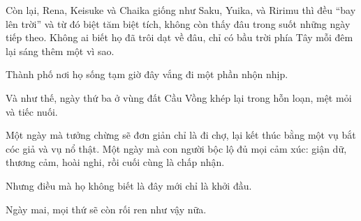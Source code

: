 \documentclass[../main.tex]{subfiles}
\begin{document}
Còn lại, Rena, Keisuke và Chaika giống như Saku, Yuika, và Ririmu thì đều ``bay lên trời'' và từ đó biệt tăm biệt tích, không còn thấy đâu trong suốt những ngày tiếp theo. Không ai biết họ đã trôi dạt về đâu, chỉ có bầu trời phía Tây mỗi đêm lại sáng thêm một vì sao.

Thành phố nơi họ sống tạm giờ đây vắng đi một phần nhộn nhịp.

Và như thế, ngày thứ ba ở vùng đất Cầu Vồng khép lại trong hỗn loạn, mệt mỏi và tiếc nuối.

Một ngày mà tưởng chừng sẽ đơn giản chỉ là đi chợ, lại kết thúc bằng một vụ bắt cóc giả và vụ nổ thật. Một ngày mà con người bộc lộ đủ mọi cảm xúc: giận dữ, thương cảm, hoài nghi, rồi cuối cùng là chấp nhận.

Nhưng điều mà họ không biết là đây mới chỉ là khởi đầu.

Ngày mai, mọi thứ sẽ còn rối ren như vậy nữa.
\end{document}
